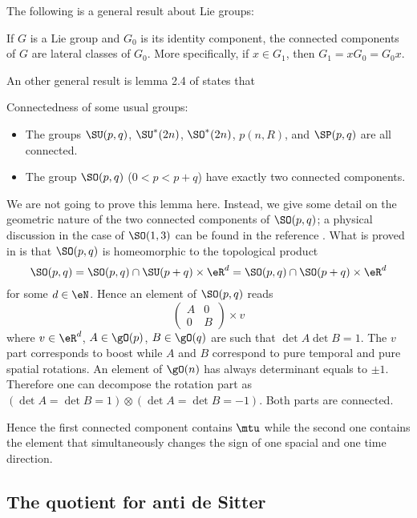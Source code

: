The following is a general result about Lie groups:
\begin{lemma}
If $G$ is a Lie group and $G_0$ is its identity component, the connected components of $G$ are lateral classes of $G_0$. More specifically, if $x\in G_1$, then $G_1=xG_0=G_0x$.
\label{LemConnSpecMo}
\end{lemma}

An other general result is lemma 2.4 of \cite{HelgasonSym} states that

\begin{lemma}
Connectedness of some usual groups:
\begin{itemize}
\item 
    The groups $\SU(p, q)$, $\SU^*(2n)$, $\SO^*(2n)$, $p(n, R)$, and $\SP(p, q)$ are
all connected.
\item 
    The group $\SO(p, q)$ ($0<p<p+q$) have exactly two connected components.
\end{itemize}
\label{LemConnSOpq}
\end{lemma}

\label{PgDisGeoConnSO}We are not going to prove this lemma here. Instead, we give some detail on the geometric nature of the two connected components of $\SO(p,q)$; a physical discussion in the case of $\SO(1,3)$ can be found in the reference \cite{Schomblond_em}. What is proved in \cite{HelgasonSym} is that $\SO(p,q)$ is homeomorphic to the topological product
\[ 
  \SO(p,q)=\SO(p,q)\cap\SU(p+q)\times \eR^{d}=\SO(p,q)\cap\SO(p+q)\times \eR^{d}
\]
for some $d\in\eN$. Hence an element of $\SO(p,q)$ reads
\[ 
  \begin{pmatrix}
A&0\\
0&B
\end{pmatrix}\times v
\]
where $v\in\eR^{d}$, $A\in \gO(p)$, $B\in\gO(q)$ are such that $\det A\det B=1$. The $v$ part corresponds to boost while $A$ and $B$ correspond to pure temporal and pure spatial rotations. An element of $\gO(n)$ has always determinant equals to $\pm 1$. Therefore one can decompose the rotation part as $(\det A=\det B=1)\otimes (\det A=\det B=-1)$. Both parts are connected.

Hence the first connected component contains $\mtu$ while the second one contains the element that simultaneously changes the sign of one spacial and one time direction.

\subsection{The quotient for anti de Sitter}

